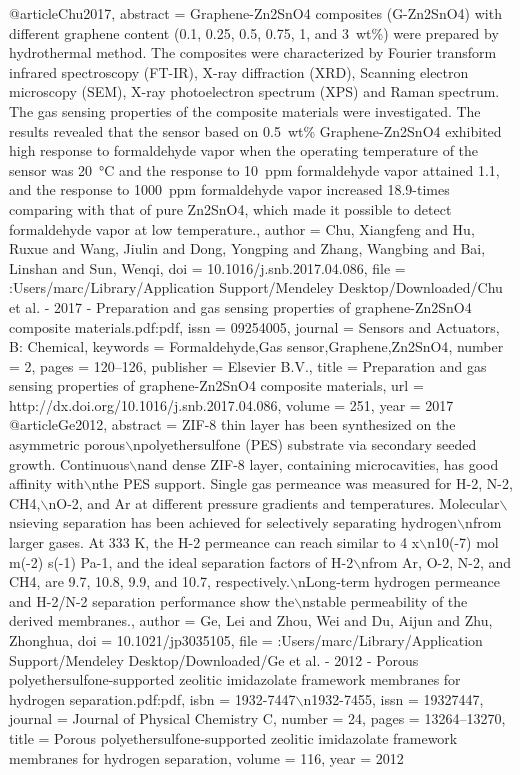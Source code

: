 @article{Chu2017,
abstract = {Graphene-Zn2SnO4 composites (G-Zn2SnO4) with different graphene content (0.1, 0.25, 0.5, 0.75, 1, and 3 wt{\%}) were prepared by hydrothermal method. The composites were characterized by Fourier transform infrared spectroscopy (FT-IR), X-ray diffraction (XRD), Scanning electron microscopy (SEM), X-ray photoelectron spectrum (XPS) and Raman spectrum. The gas sensing properties of the composite materials were investigated. The results revealed that the sensor based on 0.5 wt{\%} Graphene-Zn2SnO4 exhibited high response to formaldehyde vapor when the operating temperature of the sensor was 20 °C and the response to 10 ppm formaldehyde vapor attained 1.1, and the response to 1000 ppm formaldehyde vapor increased 18.9-times comparing with that of pure Zn2SnO4, which made it possible to detect formaldehyde vapor at low temperature.},
author = {Chu, Xiangfeng and Hu, Ruxue and Wang, Jiulin and Dong, Yongping and Zhang, Wangbing and Bai, Linshan and Sun, Wenqi},
doi = {10.1016/j.snb.2017.04.086},
file = {:Users/marc/Library/Application Support/Mendeley Desktop/Downloaded/Chu et al. - 2017 - Preparation and gas sensing properties of graphene-Zn2SnO4 composite materials.pdf:pdf},
issn = {09254005},
journal = {Sensors and Actuators, B: Chemical},
keywords = {Formaldehyde,Gas sensor,Graphene,Zn2SnO4},
number = {2},
pages = {120--126},
publisher = {Elsevier B.V.},
title = {{Preparation and gas sensing properties of graphene-Zn2SnO4 composite materials}},
url = {http://dx.doi.org/10.1016/j.snb.2017.04.086},
volume = {251},
year = {2017}
}
@article{Ge2012,
abstract = {ZIF-8 thin layer has been synthesized on the asymmetric porous$\backslash$npolyethersulfone (PES) substrate via secondary seeded growth. Continuous$\backslash$nand dense ZIF-8 layer, containing microcavities, has good affinity with$\backslash$nthe PES support. Single gas permeance was measured for H-2, N-2, CH4,$\backslash$nO-2, and Ar at different pressure gradients and temperatures. Molecular$\backslash$nsieving separation has been achieved for selectively separating hydrogen$\backslash$nfrom larger gases. At 333 K, the H-2 permeance can reach similar to 4 x$\backslash$n10(-7) mol m(-2) s(-1) Pa-1, and the ideal separation factors of H-2$\backslash$nfrom Ar, O-2, N-2, and CH4, are 9.7, 10.8, 9.9, and 10.7, respectively.$\backslash$nLong-term hydrogen permeance and H-2/N-2 separation performance show the$\backslash$nstable permeability of the derived membranes.},
author = {Ge, Lei and Zhou, Wei and Du, Aijun and Zhu, Zhonghua},
doi = {10.1021/jp3035105},
file = {:Users/marc/Library/Application Support/Mendeley Desktop/Downloaded/Ge et al. - 2012 - Porous polyethersulfone-supported zeolitic imidazolate framework membranes for hydrogen separation.pdf:pdf},
isbn = {1932-7447$\backslash$n1932-7455},
issn = {19327447},
journal = {Journal of Physical Chemistry C},
number = {24},
pages = {13264--13270},
title = {{Porous polyethersulfone-supported zeolitic imidazolate framework membranes for hydrogen separation}},
volume = {116},
year = {2012}
}
